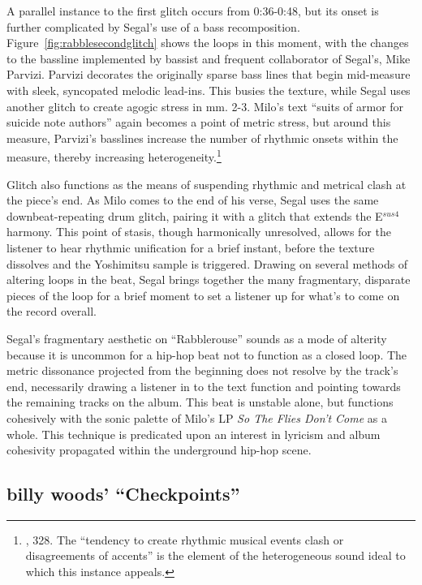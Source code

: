 A parallel instance to the first glitch occurs from 0:36-0:48, but its onset is further complicated
by Segal's use of a bass recomposition. Figure~\ref{fig:rabblesecondglitch} shows the loops in this 
moment, with the changes to the bassline implemented by bassist and frequent collaborator of Segal's, 
Mike Parvizi. Parvizi decorates the originally sparse bass lines that begin mid-measure with sleek,
syncopated melodic lead-ins. This busies the texture, while Segal uses another glitch to create agogic 
stress in mm. 2-3. Milo's text \textemdash  ``suits of armor for suicide note authors'' \textemdash again
becomes a point of metric stress, but around this measure, Parvizi's basslines increase the number of
rhythmic onsets within the measure, thereby increasing 
heterogeneity.\footnote{\cite{ollywilsonHeterogeneousSoundIdeal1992}, 328. The ``tendency to create 
rhythmic musical events clash or disagreements of accents'' is the element of the heterogeneous sound 
ideal to which this instance appeals.}

Glitch also functions as the means of suspending rhythmic and metrical clash at the piece's end. As Milo
comes to the end of his verse, Segal uses the same downbeat-repeating drum glitch, pairing it with a 
glitch that extends the E$^{sus4}$ harmony. This point of stasis, though harmonically unresolved, allows
for the listener to hear rhythmic unification for a brief instant, before the texture dissolves and the
Yoshimitsu sample is triggered. Drawing on several methods of altering loops in the beat, Segal brings
together the many fragmentary, disparate pieces of the loop for a brief moment to set a listener up for
what's to come on the record overall.

Segal's fragmentary aesthetic on ``Rabblerouse'' sounds as a mode of alterity because it is uncommon for
a hip-hop beat not to function as a closed loop. The metric dissonance projected from the beginning does
not resolve by the track's end, necessarily drawing a listener in to the text function and pointing 
towards the remaining tracks on the album. This beat is unstable alone, but functions cohesively with 
the sonic palette of Milo's LP \textit{So The Flies Don't Come} as a whole. This technique is predicated 
upon an interest in lyricism and album cohesivity propagated within the underground hip-hop scene.

\subsection*{\centering billy woods' ``Checkpoints''}

